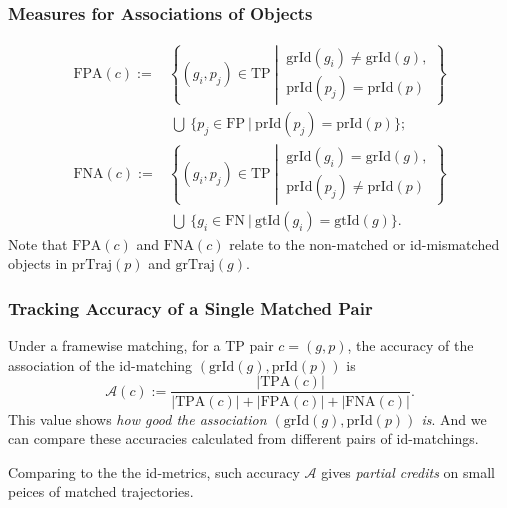 \documentclass[slidetop, mathserif]{beamer}
\begin{document}
\begin{frame}
	\frametitle{Measures for Associations of Objects}
			
	\vspace{-20pt}
	\begin{align*}
		\text{FPA}(c) := &             
		\left\{(g_i, p_j)\in\text{TP}\ \left|\ 
		\begin{array}{c}
		\text{grId}(g_i) \neq \text{grId}(g), \\
		\text{prId}(p_j) = \text{prId}(p)
		\end{array}\right.
		\right\} \\
		                 & ~ \bigcup ~ 
		\Big\{p_j\in\text{FP}\ |\ 
		\text{prId}(p_j) = \text{prId}(p)
		\Big\}; \\
		\text{FNA}(c) := &             
		\left\{(g_i, p_j)\in\text{TP}\ \left|\ 
		\begin{array}{c}
		\text{grId}(g_i) = \text{grId}(g), \\
		\text{prId}(p_j) \neq \text{prId}(p)
		\end{array}\right.
		\right\} \\
		                 & ~ \bigcup ~ 
		\Big\{g_i\in\text{FN}\ |\ 
		\text{gtId}(g_i) = \text{gtId}(g)
		\Big\}.
	\end{align*}
	Note that $\text{FPA}(c)$ and $\text{FNA}(c)$ relate to the non-matched
	or id-mismatched objects in $\text{prTraj}(p)$ and $\text{grTraj}(g)$.
			
\end{frame}

\begin{frame}
	\frametitle{Tracking Accuracy of a Single Matched Pair}

	Under a framewise matching, for a TP pair $c=(g,p)$,
	the accuracy of the association of the id-matching $(\text{grId}(g), \text{prId}(p))$
	is
	\[
		\mathcal A(c) := 
		\dfrac{|\text{TPA}(c)|}{|\text{TPA}(c)|+|\text{FPA}(c)|+|\text{FNA}(c)|}.
	\]
	This value shows
	\emph{how good the association $(\text{grId}(g), \text{prId}(p))$ is}.
	And we can compare these accuracies calculated from different pairs
	of id-matchings.

	\vspace{5pt}

	Comparing to the the id-metrics, such accuracy $\mathcal A$ gives
	\emph{partial credits} on small peices of matched trajectories.

\end{frame}
\end{document}
